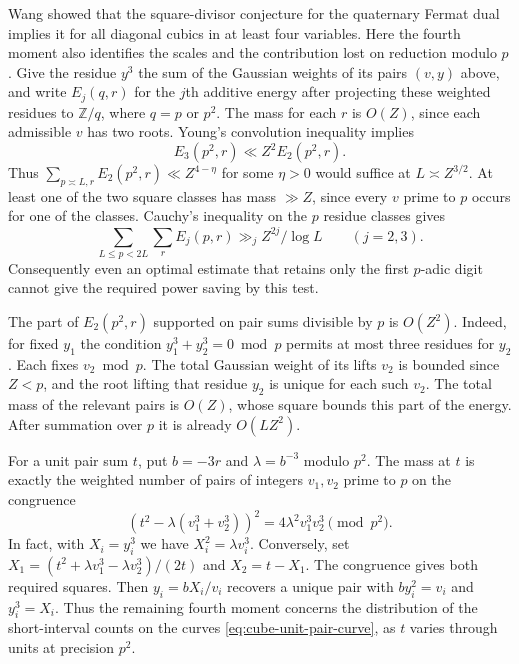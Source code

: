 \documentclass[11pt,letterpaper]{article}
\theoremstyle{definition}
\begin{document}
Wang \cite[Proposition~9.11]{c3:wang} showed that the square-divisor
conjecture for the quaternary Fermat dual implies it for all diagonal
cubics in at least four variables. Here the fourth moment also identifies
the scales and the contribution lost on reduction modulo $p$.
Give the residue $y^3$ the sum of the Gaussian weights
of its pairs $(v,y)$ above, and write $E_j(q,r)$ for the $j$th additive
energy after projecting these weighted residues to $\mathbb Z/q$, where
$q=p$ or $p^2$. The mass for each $r$ is $O(Z)$, since each admissible
$v$ has two roots. Young's convolution inequality implies
\[
 E_3(p^2,r)\ll Z^2 E_2(p^2,r).
\]
Thus $\sum_{p\asymp L,r}E_2(p^2,r)\ll Z^{4-\eta}$ for some $\eta>0$
would suffice at $L\asymp Z^{3/2}$. At least one of the two square
classes has mass $\gg Z$, since every $v$ prime to $p$ occurs for one
of the classes. Cauchy's inequality on the $p$ residue classes gives
\[
          \sum_{L\le p<2L}\sum_r E_j(p,r)
               \gg_j Z^{2j}/\log L\qquad(j=2,3).
\]
Consequently even an optimal estimate that retains only the first
$p$-adic digit cannot give the required power saving by this test.

The part of $E_2(p^2,r)$ supported on pair sums divisible by $p$ is
$O(Z^2)$. Indeed, for fixed $y_1$ the condition
$y_1^3+y_2^3=0\bmod p$ permits at most three residues for $y_2$.
Each fixes $v_2\bmod p$. The total Gaussian weight of its lifts $v_2$
is bounded since $Z<p$, and the root lifting that residue $y_2$ is
unique for each such $v_2$. The total mass of the relevant pairs is
$O(Z)$, whose square bounds this part of the energy. After summation
over $p$ it is already $O(LZ^2)$.

For a unit pair sum $t$, put $b=-3r$ and $\lambda=b^{-3}$ modulo $p^2$.
The mass at $t$ is exactly the weighted number of pairs of integers
$v_1,v_2$ prime to $p$ on the congruence
\begin{equation}\label{eq:cube-unit-pair-curve}
 (t^2-\lambda(v_1^3+v_2^3))^2
                   =4\lambda^2 v_1^3v_2^3\pmod{p^2}.
\end{equation}
In fact, with $X_i=y_i^3$ we have $X_i^2=\lambda v_i^3$.
Conversely, set
$X_1=(t^2+\lambda v_1^3-\lambda v_2^3)/(2t)$ and $X_2=t-X_1$.
The congruence gives both required squares. Then $y_i=bX_i/v_i$
recovers a unique pair with $b y_i^2=v_i$ and $y_i^3=X_i$.
Thus the remaining fourth moment concerns the distribution of the
short-interval counts on the curves \eqref{eq:cube-unit-pair-curve},
as $t$ varies through units at precision $p^2$.
\end{document}
